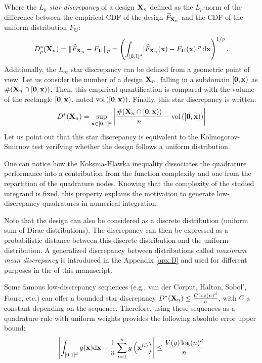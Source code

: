 Where the \textit{$L_p$ star discrepancy} of a design ${\bf X}_n$ defined as the $L_p$-norm of the difference between the empirical CDF of the design $\widehat{F}_{{\bf X}_n}$ and the CDF of the uniform distribution $F_{\textbf{U}}$:  
\begin{equation}
    D^*_p({\bf X}_n) = \lVert \widehat{F}_{{\bf X}_n} - F_{\textbf{U}}\rVert _p = \left(\int_{[0, 1]^d} \lvert\widehat{F}_{{\bf X}_n}({\bf x}) - F_{\textbf{U}}({\bf x})\rvert ^p \, \mathrm{d}{\bf x} \right)^{1/p}.
\end{equation}
Additionally, the $L_\infty$ star discrepancy can be defined from a geometric point of view. 
Let us consider the number of a design ${\bf X}_n$, falling in a subdomain $[\mathbf{0}, {\bf x})$ as $\#({\bf X}_n \cap [\mathbf{0}, {\bf x}))$. 
Then, this empirical quantification is compared with the volume of the rectangle $[\mathbf{0}, {\bf x})$, noted $\mathrm{vol}\left([\mathbf{0}, {\bf x})\right)$.  
Finally, this star discrepancy is written:   
\begin{equation}
    D^*({\bf X}_n) = \sup_{{\bf x} \in [0, 1]^d} \left| \frac{\#({\bf X}_n \cap [\mathbf{0}, {\bf x}))}{n} - \mathrm{vol}\left([\mathbf{0}, {\bf x})\right)\right|
\end{equation}
Let us point out that this star discrepancy is equivalent to the Kolmogorov-Smirnov test verifying whether the design follows a uniform distribution. 

\noindent
One can notice how the Koksma-Hlawka inequality dissociates the quadrature performance into a contribution from the function complexity and one from the repartition of the quadrature nodes. 
Knowing that the complexity of the studied integrand is fixed, this property explains the motivation to generate low-discrepancy quadratures in numerical integration.  

Note that the design can also be considered as a discrete distribution (uniform sum of Dirac distributions).
The discrepancy can then be expressed as a probabilistic distance between this discrete distribution and the uniform distribution. 
A generalized discrepancy between distributions called \textit{maximum mean discrepancy} is introduced in the Appendix \ref{apx:D} and used for different purposes in the  of this manuscript.

Some famous low-discrepancy sequences (e.g., van der Corput, Halton, Sobol', Faure, etc.) can offer a bounded star discrepancy $D^*({\bf X}_n) \leq \frac{C \log(n)^d}{n}$, with $C$ a constant depending on the sequence.
Therefore, using these sequences as a quadrature rule with uniform weights provides the following absolute error upper bound: 
\begin{equation}
    \left| \int_{[0, 1]^d} g({\bf x}) \mathrm{d}{\bf x} - \frac1n \sum_{i=1}^n g\left({\bf x}^{(i)}\right)\right| \leq  \frac{V(g) \log(n)^d}{n}
\end{equation}

